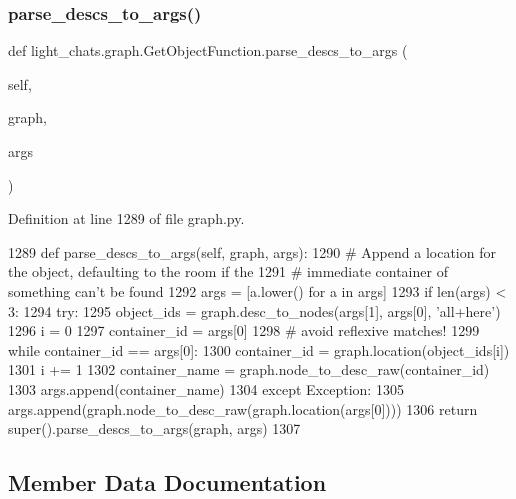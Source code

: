 \subsubsection{\texorpdfstring{parse\+\_\+descs\+\_\+to\+\_\+args()}{parse\_descs\_to\_args()}}
{\footnotesize\ttfamily def light\+\_\+chats.\+graph.\+Get\+Object\+Function.\+parse\+\_\+descs\+\_\+to\+\_\+args (\begin{DoxyParamCaption}\item[{}]{self,  }\item[{}]{graph,  }\item[{}]{args }\end{DoxyParamCaption})}



Definition at line 1289 of file graph.\+py.


\begin{DoxyCode}
1289     \textcolor{keyword}{def }parse\_descs\_to\_args(self, graph, args):
1290         \textcolor{comment}{# Append a location for the object, defaulting to the room if the}
1291         \textcolor{comment}{# immediate container of something can't be found}
1292         args = [a.lower() \textcolor{keywordflow}{for} a \textcolor{keywordflow}{in} args]
1293         \textcolor{keywordflow}{if} len(args) < 3:
1294             \textcolor{keywordflow}{try}:
1295                 object\_ids = graph.desc\_to\_nodes(args[1], args[0], \textcolor{stringliteral}{'all+here'})
1296                 i = 0
1297                 container\_id = args[0]
1298                 \textcolor{comment}{# avoid reflexive matches!}
1299                 \textcolor{keywordflow}{while} container\_id == args[0]:
1300                     container\_id = graph.location(object\_ids[i])
1301                     i += 1
1302                 container\_name = graph.node\_to\_desc\_raw(container\_id)
1303                 args.append(container\_name)
1304             \textcolor{keywordflow}{except} Exception:
1305                 args.append(graph.node\_to\_desc\_raw(graph.location(args[0])))
1306         \textcolor{keywordflow}{return} super().parse\_descs\_to\_args(graph, args)
1307 
\end{DoxyCode}


\subsection{Member Data Documentation}
\mbox{\label{classlight__chats_1_1graph_1_1GetObjectFunction_a726f8b3315bfedc530da445bb3e135e6}} 
